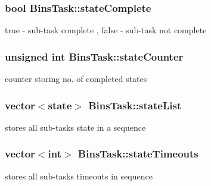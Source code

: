 \subsubsection[{\texorpdfstring{state\+Complete}{stateComplete}}]{\setlength{\rightskip}{0pt plus 5cm}bool Bins\+Task\+::state\+Complete}\hypertarget{classBinsTask_a9376c8b742619429bf6e71818aa4813c}{}\label{classBinsTask_a9376c8b742619429bf6e71818aa4813c}


true -\/ sub-\/task complete , false -\/ sub-\/task not complete 

\subsubsection[{\texorpdfstring{state\+Counter}{stateCounter}}]{\setlength{\rightskip}{0pt plus 5cm}unsigned int Bins\+Task\+::state\+Counter}\hypertarget{classBinsTask_aa69dd4866994a26d64c45aaf2d778527}{}\label{classBinsTask_aa69dd4866994a26d64c45aaf2d778527}


counter storing no. of completed states 

\subsubsection[{\texorpdfstring{state\+List}{stateList}}]{\setlength{\rightskip}{0pt plus 5cm}vector$<${\bf state}$>$ Bins\+Task\+::state\+List}\hypertarget{classBinsTask_abd44d0fdbe28dbd619f841a2d0c36be4}{}\label{classBinsTask_abd44d0fdbe28dbd619f841a2d0c36be4}


stores all sub-\/tasks state in a sequence 

\subsubsection[{\texorpdfstring{state\+Timeouts}{stateTimeouts}}]{\setlength{\rightskip}{0pt plus 5cm}vector$<$int$>$ Bins\+Task\+::state\+Timeouts}\hypertarget{classBinsTask_a7faea4476a80bd6350abb38efe438888}{}\label{classBinsTask_a7faea4476a80bd6350abb38efe438888}


stores all sub-\/tasks timeouts in sequence 

